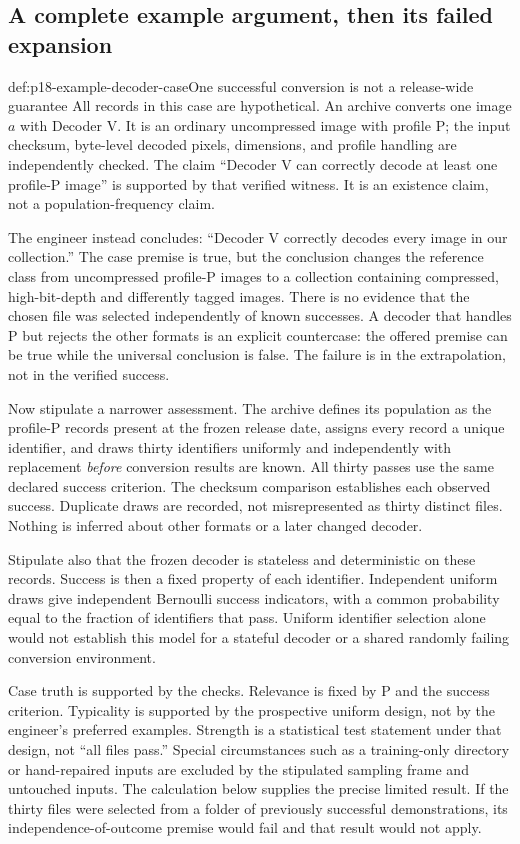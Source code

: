 \subsection{A complete example argument, then its failed expansion}
\label{sec:p18-example-worked}

\begin{hbexample}{def:p18-example-decoder-case}{One successful conversion is not a release-wide guarantee}
All records in this case are hypothetical. An archive converts one image
\(a\) with Decoder V. It is an ordinary uncompressed image with profile P;
the input checksum, byte-level decoded pixels, dimensions, and profile handling
are independently checked. The claim ``Decoder V can correctly decode at least
one profile-P image'' is supported by that verified witness. It is an existence
claim, not a population-frequency claim.

The engineer instead concludes: ``Decoder V correctly decodes every image in
our collection.'' The case premise is true, but the conclusion changes the
reference class from uncompressed profile-P images to a collection containing
compressed, high-bit-depth and differently tagged images. There is no evidence
that the chosen file was selected independently of known successes. A decoder
that handles P but rejects the other formats is an explicit countercase:
the offered premise can be true while the universal conclusion is false.
The failure is in the extrapolation, not in the verified success.

Now stipulate a narrower assessment. The archive defines its population as
the profile-P records present at the frozen release date, assigns every record
a unique identifier, and draws thirty identifiers uniformly and independently
with replacement \emph{before} conversion results are known. All thirty
passes use the same declared success criterion. The checksum comparison
establishes each observed success. Duplicate draws are recorded, not
misrepresented as thirty distinct files. Nothing is inferred about other
formats or a later changed decoder.

Stipulate also that the frozen decoder is stateless and deterministic on
these records. Success is then a fixed property of each identifier.
Independent uniform draws give independent Bernoulli success indicators,
with a common probability equal to the fraction of identifiers that pass.
Uniform identifier selection alone would not establish this model for a
stateful decoder or a shared randomly failing conversion environment.

Case truth is supported by the checks. Relevance is fixed by P and the success
criterion. Typicality is supported by the prospective uniform design, not by
the engineer's preferred examples. Strength is a statistical test statement
under that design, not ``all files pass.'' Special circumstances such as a
training-only directory or hand-repaired inputs are excluded by the stipulated
sampling frame and untouched inputs. The calculation below supplies the
precise limited result. If the thirty files were selected from a folder of
previously successful demonstrations, its independence-of-outcome premise
would fail and that result would not apply.
\end{hbexample}

